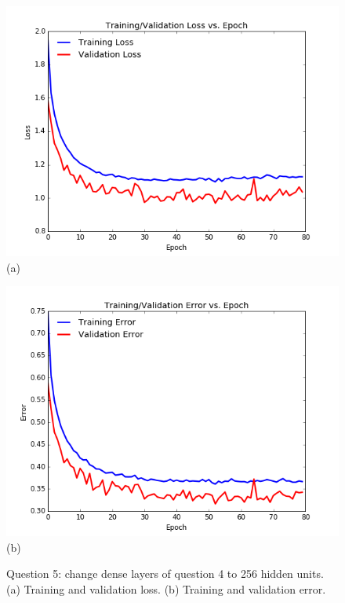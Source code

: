 \documentclass[paper=a4, fontsize=11pt]{scrartcl}
\begin{document}
\begin{figure}
\centering
\centering
 \begin{minipage}{.5\columnwidth}
\centering
  	\includegraphics[width=1\linewidth]{question5b_loss.png}
  	\footnotesize{(a)}
 \end{minipage}\hfill%
\centering
 \begin{minipage}{.5\columnwidth}
\centering
  	\includegraphics[width=1\columnwidth]{question5b_error.png}
  	\footnotesize{(b)}
 \end{minipage}\hfill%
\caption{Question 5: change dense layers of question 4 to 256 hidden units. (a) Training and validation loss. (b) Training and validation error.}
\label{fig:question5b}
\end{figure}
\end{document}
